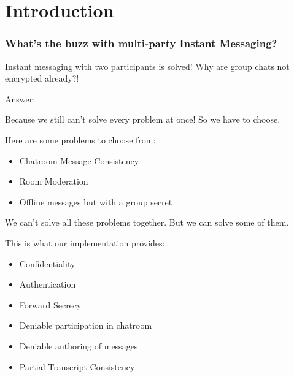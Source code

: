 \section{Introduction}

\newcommand{\mandragore}{\textcolor{blue}{mandragore}}
\newcommand{\vulpecula}{\textcolor{green}{vulpecula}}
\newcommand{\noscope}{\textcolor{red}{noscope}}

\begin{frame}
  \frametitle{What's the buzz with multi-party Instant Messaging?}
  \centering
  Instant messaging with two participants is solved!
  Why are group chats not encrypted already?!\\[0.3cm]
\end{frame}

\begin{frame}
  \centering
  Answer:

  Because we still can't solve every problem at once! So we have to choose.
\end{frame}

\begin{frame}

  Here are some problems to choose from:

  \begin{itemize}
    \item Chatroom Message Consistency
    \item Room Moderation
    \item Offline messages but with a group secret
  \end{itemize}

  \vfill

  We can't solve all these problems together. But we can solve some of them.

\end{frame}

\begin{frame}
  This is what our implementation provides:

  \begin{itemize}
    \item Confidentiality
    \item Authentication
    \item Forward Secrecy
    \item Deniable participation in chatroom
    \item Deniable authoring of messages
    \item Partial Transcript Consistency
  \end{itemize}

\end{frame}

